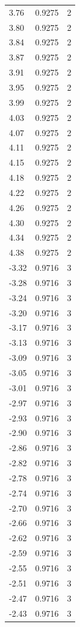 \begin{longtable}{lrr}
  3.76 & 0.9275 & 2 \\
  3.80 & 0.9275 & 2 \\
  3.84 & 0.9275 & 2 \\
  3.87 & 0.9275 & 2 \\
  3.91 & 0.9275 & 2 \\
  3.95 & 0.9275 & 2 \\
  3.99 & 0.9275 & 2 \\
  4.03 & 0.9275 & 2 \\
  4.07 & 0.9275 & 2 \\
  4.11 & 0.9275 & 2 \\
  4.15 & 0.9275 & 2 \\
  4.18 & 0.9275 & 2 \\
  4.22 & 0.9275 & 2 \\
  4.26 & 0.9275 & 2 \\
  4.30 & 0.9275 & 2 \\
  4.34 & 0.9275 & 2 \\
  4.38 & 0.9275 & 2 \\
  -3.32 & 0.9716 & 3 \\
  -3.28 & 0.9716 & 3 \\
  -3.24 & 0.9716 & 3 \\
  -3.20 & 0.9716 & 3 \\
  -3.17 & 0.9716 & 3 \\
  -3.13 & 0.9716 & 3 \\
  -3.09 & 0.9716 & 3 \\
  -3.05 & 0.9716 & 3 \\
  -3.01 & 0.9716 & 3 \\
  -2.97 & 0.9716 & 3 \\
  -2.93 & 0.9716 & 3 \\
  -2.90 & 0.9716 & 3 \\
  -2.86 & 0.9716 & 3 \\
  -2.82 & 0.9716 & 3 \\
  -2.78 & 0.9716 & 3 \\
  -2.74 & 0.9716 & 3 \\
  -2.70 & 0.9716 & 3 \\
  -2.66 & 0.9716 & 3 \\
  -2.62 & 0.9716 & 3 \\
  -2.59 & 0.9716 & 3 \\
  -2.55 & 0.9716 & 3 \\
  -2.51 & 0.9716 & 3 \\
  -2.47 & 0.9716 & 3 \\
  -2.43 & 0.9716 & 3 \\

\end{longtable}
